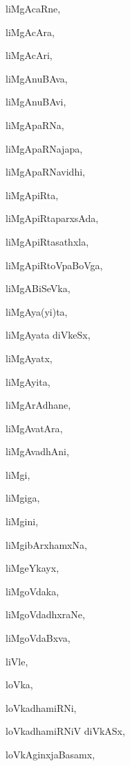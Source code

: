 \begin{multicols}{2}
{liMgAcaRne}, \pageref{liMgAcaRne}

{liMgAcAra}, \pageref{liMgAcAra}

{liMgAcAri}, \pageref{liMgAcAri}

{liMgAnuBAva}, \pageref{liMgAnuBAva}

{liMgAnuBAvi}, \pageref{liMgAnuBAvi}

{liMgApaRNa}, \pageref{liMgApaRNa}

{liMgApaRNajapa}, \pageref{liMgApaRNajapa}

{liMgApaRNavidhi}, \pageref{liMgApaRNavidhi}

{liMgApiRta}, \pageref{liMgApiRta}

{liMgApiRtaparxsAda}, \pageref{liMgApiRtaparxsAda}

{liMgApiRtasathxla}, \pageref{liMgApiRtasathxla}

{liMgApiRtoVpaBoVga}, \pageref{liMgApiRtoVpaBoVga}

{liMgABiSeVka}, \pageref{liMgABiSeVka}

{liMgAya(yi)ta}, \pageref{liMgAyayita}

{liMgAyata diVkeSx}, \pageref{liMgAyatadiVkeSx}

{liMgAyatx}, \pageref{liMgAyatx}

{liMgAyita}, \pageref{liMgAyita}

{liMgArAdhane}, \pageref{liMgArAdhane}

{liMgAvatAra}, \pageref{liMgAvatAra}

{liMgAvadhAni}, \pageref{liMgAvadhAni}

{liMgi}, \pageref{liMgi}

{liMgiga}, \pageref{liMgiga}

{liMgini}, \pageref{liMgini}

{liMgibArxhamxNa}, \pageref{liMgibArxhamxNa}

{liMgeYkayx}, \pageref{liMgeYkayx}

{liMgoVdaka}, \pageref{liMgoVdaka}

{liMgoVdadhxraNe}, \pageref{liMgoVdadhxraNe}

{liMgoVdaBxva}, \pageref{liMgoVdaBxva}

{liVle}, \pageref{liVle}

{loVka}, \pageref{loVka}

{loVkadhamiRNi}, \pageref{loVkadhamiRNi}

{loVkadhamiRNiV diVkASx}, \pageref{loVkadhamiRNiVdiVkASx}

{loVkAginxjaBasamx}, \pageref{loVkAginxjaBasamx}


\end{multicols}
